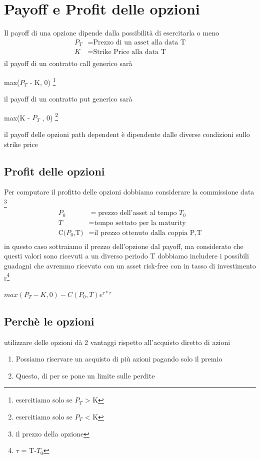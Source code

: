 \documentclass[a4paper,11pt]{report}
\begin{document}
{\section{Payoff e Profit delle opzioni}
	Il payoff di una opzione dipende dalla possibilità di esercitarla o meno
\begin{align*}
	\text{$P_T$} &= \text{Prezzo di un asset alla data T} \\
	K &= \text{Strike Price alla data T} \\
\end{align*}
	il payoff di un contratto call generico sarà
\begin{center}	
	max($P_T$ - K, 0) \footnote{ esercitiamo solo se $P_T$ > K}
\end {center}
	il payoff di un contratto put generico sarà
\begin{center}	
	max(K - $P_T$ , 0) \footnote {esercitiamo solo se $P_T$ < K}
\end {center}
	il payoff delle opzioni path dependent è dipendente dalle diverse condizioni sullo strike price \newline
\subsection {Profit delle opzioni}
	Per computare il profitto delle opzioni dobbiamo considerare la commissione data \footnote{il prezzo della opzione}
\begin{align*}
	\text{$P_0$} &= \text{prezzo dell'asset al tempo $T_0$} \\
	T &= \text{tempo settato per la maturity} \\
	\text{C($P_0$,T)} &= \text{il prezzo ottenuto dalla coppia P,T}\\
\end{align*}
in questo caso sottraiamo il prezzo dell'opzione dal payoff, ma considerato che questi valori sono ricevuti a un diverso periodo T dobbiamo includere i possibili guadagni che avremmo ricevuto con un asset risk-free con in tasso di investimento r\footnote{ $\tau$ = T-$T_0$} \newline

\begin{center}
	$max(P_T - K, 0) - C(P_0,T)e^{r*\tau}$
\end{center}
\subsection{Perchè le opzioni}
	utilizzare delle opzioni dà 2 vantaggi rispetto all'acquisto diretto di azioni
\begin{enumerate}
	\item Possiamo riservare un acquisto di più azioni pagando solo il premio
	\item Questo, di per se pone un limite sulle perdite
\end{enumerate}
}
\end{document}
